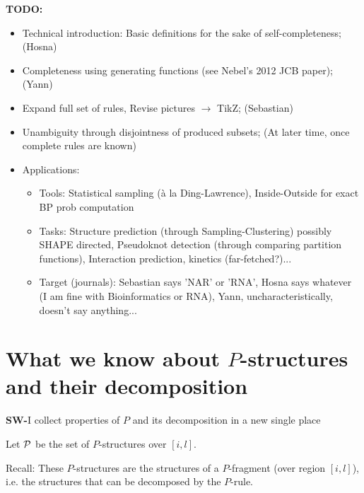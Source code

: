 \documentclass[11pt]{article} %
\newcommand{\SW}[1]{\textbf{SW-}#1}
\begin{document}
\newpage
{\bf TODO:}
\begin{itemize}
  \item Technical introduction: Basic definitions for the sake of self-completeness; (Hosna)
  \item Completeness using generating functions (see Nebel's 2012 JCB paper); (Yann)
  \item Expand full set of rules, Revise pictures $\to$ TikZ; (Sebastian)
  \item Unambiguity through disjointness of produced subsets; (At later time, once complete rules are known)
  \item Applications: 
   \begin{itemize}
    \item Tools: Statistical sampling (à la Ding-Lawrence), Inside-Outside for exact BP prob computation
    \item Tasks: Structure prediction (through Sampling-Clustering) possibly SHAPE directed, Pseudoknot detection (through comparing partition functions), Interaction prediction, kinetics (far-fetched?)...
    \item Target (journals): Sebastian says 'NAR' or 'RNA', Hosna says whatever (I am fine with Bioinformatics or RNA), Yann, uncharacteristically, doesn't say anything...
  \end{itemize}
\end{itemize}

\newpage
\section{What we know about $P$-structures and their decomposition}
\label{sec:pdecomposition}
\SW{I collect properties of $P$ and its decomposition in a new single place}

\renewcommand{\P}{{\cal P}}

Let $\P$ be the set of $P$-structures over $[i,l]$.

Recall: These $P$-structures are the structures of a $P$-fragment (over region $[i,l]$), i.e. the structures that can be decomposed by the $P$-rule.
\end{document}
